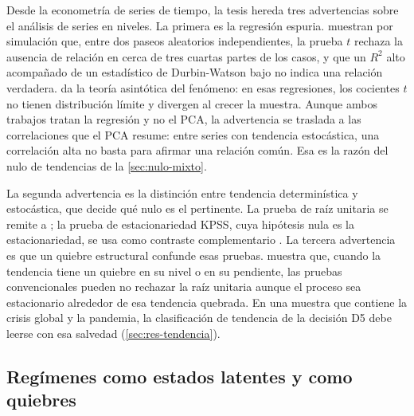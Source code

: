 Desde la econometría de series de tiempo, la tesis hereda tres advertencias sobre el análisis de
series en niveles. La primera es la regresión espuria. \textcite{granger_newbold_1974} muestran por simulación que, entre dos paseos aleatorios independientes, la prueba
$t$ rechaza la ausencia de relación en cerca de tres cuartas partes de los casos, y que un $R^2$
alto acompañado de un estadístico de Durbin-Watson bajo no indica una relación verdadera.
\textcite{phillips_1986} da la teoría asintótica del fenómeno: en esas
regresiones, los cocientes $t$ no tienen distribución límite y divergen al crecer la muestra.
Aunque ambos trabajos tratan la regresión y no el PCA, la advertencia se traslada a las
correlaciones que el PCA resume: entre series con tendencia estocástica, una correlación alta no
basta para afirmar una relación común. Esa es la razón del nulo de tendencias de la
\cref{sec:nulo-mixto}.

La segunda advertencia es la distinción entre tendencia determinística y estocástica, que decide
qué nulo es el pertinente. La prueba de raíz unitaria se remite a
\textcite{dickey_fuller_1979}; la prueba de estacionariedad
KPSS, cuya hipótesis nula es la estacionariedad, se usa como contraste complementario
\parencite{kwiatkowski_et_al_1992}. La tercera advertencia es que un quiebre estructural confunde
esas pruebas. \textcite{perron_1989} muestra que, cuando la tendencia tiene un quiebre en su nivel o en su
pendiente, las pruebas convencionales pueden no rechazar la raíz unitaria aunque el proceso sea
estacionario alrededor de esa tendencia quebrada. En una muestra que contiene la crisis global y la
pandemia, la clasificación de tendencia de la decisión D5 debe leerse con esa salvedad
(\cref{sec:res-tendencia}).

\subsection{Regímenes como estados latentes y como quiebres}

